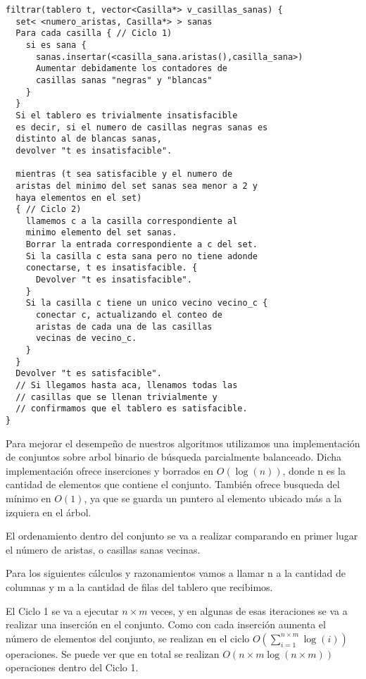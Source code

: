 \documentclass[a4paper, 12pt] {article}
\begin{document}
\begin{verbatim}
filtrar(tablero t, vector<Casilla*> v_casillas_sanas) {
  set< <numero_aristas, Casilla*> > sanas
  Para cada casilla { // Ciclo 1)
    si es sana {
      sanas.insertar(<casilla_sana.aristas(),casilla_sana>)
      Aumentar debidamente los contadores de 
      casillas sanas "negras" y "blancas"
    }
  }
  Si el tablero es trivialmente insatisfacible 
  es decir, si el numero de casillas negras sanas es 
  distinto al de blancas sanas,
  devolver "t es insatisfacible".
  
  mientras (t sea satisfacible y el numero de 
  aristas del minimo del set sanas sea menor a 2 y
  haya elementos en el set)
  { // Ciclo 2)
    llamemos c a la casilla correspondiente al
    minimo elemento del set sanas.
    Borrar la entrada correspondiente a c del set.
    Si la casilla c esta sana pero no tiene adonde 
    conectarse, t es insatisfacible. {
      Devolver "t es insatisfacible".
    }
    Si la casilla c tiene un unico vecino vecino_c {
      conectar c, actualizando el conteo de
      aristas de cada una de las casillas 
      vecinas de vecino_c.
    }
  }
  Devolver "t es satisfacible".
  // Si llegamos hasta aca, llenamos todas las
  // casillas que se llenan trivialmente y 
  // confirmamos que el tablero es satisfacible.
}

\end{verbatim}


Para mejorar el desempe\~no de nuestros algoritmos utilizamos una implementaci\'on de conjuntos sobre arbol binario de b\'usqueda parcialmente balanceado. Dicha implementaci\'on ofrece inserciones y borrados en $O\left( \log\left( n\right) \right) $, donde n es la cantidad de elementos que contiene el conjunto. Tambi\'en ofrece busqueda del m\'inimo en $O\left( 1\right) $, ya que se guarda un puntero al elemento ubicado m\'as a la izquiera en el \'arbol.


El ordenamiento dentro del conjunto se va a realizar comparando en primer lugar el n\'umero de aristas, o casillas sanas vecinas.


Para los siguientes c\'alculos y razonamientos vamos a llamar n a la cantidad de columnas y m a la cantidad de filas del tablero que recibimos.


El Ciclo 1 se va a ejecutar $n\times m $ veces, y en algunas de esas iteraciones se va a realizar una inserci\'on en el conjunto. Como con cada inserci\'on aumenta el n\'umero de elementos del conjunto, se realizan en el ciclo $O\left( \textstyle\sum_{i=1}^{n\times m} \log\left( i\right) \right) $ operaciones. Se puede ver que en total se realizan $ O\left( n\times m \log\left( n\times m\right) \right) $ operaciones dentro del Ciclo 1.
\end{document}
